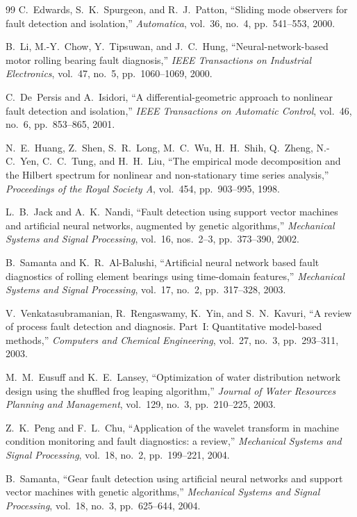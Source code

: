 \begin{thebibliography}{99}
C.~Edwards, S.~K.~Spurgeon, and R.~J.~Patton,
``Sliding mode observers for fault detection and isolation,''
\textit{Automatica}, vol.~36, no.~4, pp.~541--553, 2000.

B.~Li, M.-Y.~Chow, Y.~Tipsuwan, and J.~C.~Hung,
``Neural-network-based motor rolling bearing fault diagnosis,''
\textit{IEEE Transactions on Industrial Electronics}, vol.~47, no.~5, pp.~1060--1069, 2000.

C.~De~Persis and A.~Isidori,
``A differential-geometric approach to nonlinear fault detection and isolation,''
\textit{IEEE Transactions on Automatic Control}, vol.~46, no.~6, pp.~853--865, 2001.

N.~E.~Huang, Z.~Shen, S.~R.~Long, M.~C.~Wu, H.~H.~Shih, Q.~Zheng, N.-C.~Yen, C.~C.~Tung, and H.~H.~Liu,
``The empirical mode decomposition and the Hilbert spectrum for nonlinear and non-stationary time series analysis,''
\textit{Proceedings of the Royal Society A}, vol.~454, pp.~903--995, 1998.

L.~B.~Jack and A.~K.~Nandi,
``Fault detection using support vector machines and artificial neural networks, augmented by genetic algorithms,''
\textit{Mechanical Systems and Signal Processing}, vol.~16, nos.~2--3, pp.~373--390, 2002.

B.~Samanta and K.~R.~Al-Balushi,
``Artificial neural network based fault diagnostics of rolling element bearings using time-domain features,''
\textit{Mechanical Systems and Signal Processing}, vol.~17, no.~2, pp.~317--328, 2003.

V.~Venkatasubramanian, R.~Rengaswamy, K.~Yin, and S.~N.~Kavuri,
``A review of process fault detection and diagnosis. Part~I: Quantitative model-based methods,''
\textit{Computers and Chemical Engineering}, vol.~27, no.~3, pp.~293--311, 2003.

M.~M.~Eusuff and K.~E.~Lansey,
``Optimization of water distribution network design using the shuffled frog leaping algorithm,''
\textit{Journal of Water Resources Planning and Management}, vol.~129, no.~3, pp.~210--225, 2003.

Z.~K.~Peng and F.~L.~Chu,
``Application of the wavelet transform in machine condition monitoring and fault diagnostics: a review,''
\textit{Mechanical Systems and Signal Processing}, vol.~18, no.~2, pp.~199--221, 2004.

B.~Samanta,
``Gear fault detection using artificial neural networks and support vector machines with genetic algorithms,''
\textit{Mechanical Systems and Signal Processing}, vol.~18, no.~3, pp.~625--644, 2004.


\end{thebibliography}
